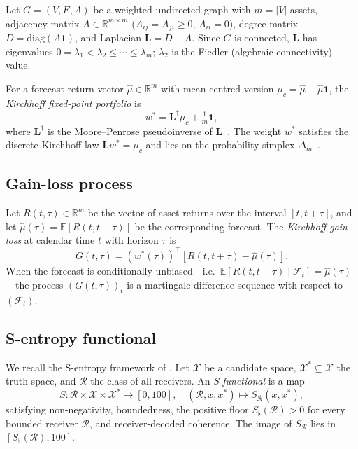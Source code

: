 \documentclass[twocolumn,11pt,a4paper]{article}
\theoremstyle{thmstyle}
\theoremstyle{definition}
\theoremstyle{remark}
\newcommand{\Gain}{G}                        %
\newcommand{\Sval}{S}                        %
\newcommand{\Sfloor}{S_{\flat}}              %
\newcommand{\wstar}{w^{*}}                   %
\newcommand{\Lop}{\mathbf{L}}               %
\newcommand{\Lpinv}{\mathbf{L}^{\dagger}}   %
\newcommand{\lamtwo}{\lambda_{2}}           %
\newcommand{\Deltam}{\Delta_{m}}            %
\newcommand{\Real}{\mathbb{R}}
\newcommand{\Expect}{\mathbb{E}}
\newcommand{\Filtr}{\mathcal{F}}
\newcommand{\Receiver}{\mathcal{R}}
\begin{document}
Let $G=(V,E,A)$ be a weighted undirected graph with
$m=|V|$ assets, adjacency matrix $A\in\Real^{m\times m}$
($A_{ij}=A_{ji}\geq 0$, $A_{ii}=0$), degree matrix
$D=\mathrm{diag}(A\mathbf{1})$, and Laplacian
$\Lop=D-A$.  Since $G$ is connected, $\Lop$ has
eigenvalues $0=\lambda_{1}<\lamtwo\leq\cdots\leq\lambda_{m}$;
$\lamtwo$ is the Fiedler (algebraic connectivity) value.

For a forecast return vector $\hat\mu\in\Real^{m}$ with
mean-centred version $\mu_{c}=\hat\mu-\bar{\hat\mu}\mathbf{1}$,
the \emph{Kirchhoff fixed-point portfolio} is
\begin{equation}\label{eq:kfp}
  \wstar = \Lpinv\mu_{c} + \tfrac{1}{m}\mathbf{1},
\end{equation}
where $\Lpinv$ is the Moore--Penrose pseudoinverse of
$\Lop$~\citep{Penrose1955}.  The weight $\wstar$ satisfies
the discrete Kirchhoff law $\Lop\wstar=\mu_{c}$ and lies
on the probability simplex $\Deltam$~\citep{Kirchhoff1847}.

\subsection{Gain-loss process}

Let $R(t,\tau)\in\Real^{m}$ be the vector of asset returns
over the interval $[t,t+\tau]$, and let $\hat\mu(\tau)
=\Expect[R(t,t+\tau)]$ be the corresponding forecast.
The \emph{Kirchhoff gain-loss} at calendar time $t$ with
horizon $\tau$ is
\begin{equation}\label{eq:gain}
  \Gain(t,\tau) = (\wstar(\tau))^{\top}
                  [R(t,t+\tau)-\hat\mu(\tau)].
\end{equation}
When the forecast is conditionally unbiased---i.e.\
$\Expect[R(t,t+\tau)\mid\Filtr_{t}]=\hat\mu(\tau)$---the
process $(\Gain(t,\tau))_{t}$ is a martingale difference
sequence with respect to $(\Filtr_{t})$.

\subsection{S-entropy functional}

We recall the S-entropy framework of \citet{Sachikonye2024S}.
Let $\mathcal{X}$ be a candidate space, $\mathcal{X}^{*}
\subseteq\mathcal{X}$ the truth space, and $\Receiver$ the
class of all receivers.  An \emph{S-functional} is a map
\begin{equation}\label{eq:sfunc}
  \Sval : \Receiver \times \mathcal{X} \times \mathcal{X}^{*}
          \to [0,100],
  \quad (\mathcal{R},x,x^{*}) \mapsto \Sval_{\mathcal{R}}(x,x^{*}),
\end{equation}
satisfying non-negativity, boundedness, the positive floor
$\Sfloor(\mathcal{R})>0$ for every bounded receiver
$\mathcal{R}$, and receiver-decoded coherence.  The image
of $\Sval_{\mathcal{R}}$ lies in $[\Sfloor(\mathcal{R}),100]$.
\end{document}
